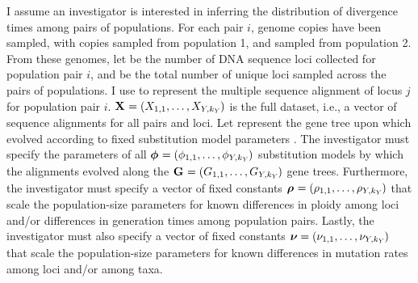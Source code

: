 I assume an investigator is interested in inferring the distribution
of divergence times among \npairs{} pairs of populations.
For each pair $i$,  genome copies have been sampled, with
 copies sampled from population 1, and 
sampled from population 2.
From these genomes, let  be the number of DNA sequence loci collected
for population pair $i$, and \nlociTotal be the total number of unique loci
sampled across the \npairs{} pairs of populations.
I use  to represent the multiple sequence alignment of
locus $j$ for population pair $i$.
$\alignmentVector = (\alignment{1}{1}, \ldots,
    \alignment{\npairs{}}{\nloci{\npairs{}}})$
is the full dataset,
i.e., a vector of sequence alignments for all pairs and loci.
Let  represent the gene tree upon which 
evolved according to fixed \hky substitution model parameters .
The investigator must specify the parameters of all
$\hkyModelVector = (\hkyModel{1}{1}, \ldots,
\hkyModel{\npairs{}}{\nloci{\npairs{}}})$
substitution models by which the alignments evolved along the
$\geneTreeVector = (\geneTree{1}{1}, \ldots,
\geneTree{\npairs{}}{\nloci{\npairs{}}})$
gene trees.
Furthermore, the investigator must specify a vector of fixed constants
$\ploidyScalarVector = (\ploidyScalar{1}{1}, \ldots,
\ploidyScalar{\npairs{}}{\nloci{\npairs{}}})$
that scale the population-size parameters for known differences in ploidy among
loci and/or differences in generation times among population pairs.  Lastly,
the investigator must also specify a vector of fixed constants
$\mutationRateScalarConstantVector = (\mutationRateScalarConstant{1}{1},
\ldots, \mutationRateScalarConstant{\npairs{}}{\nloci{\npairs{}}})$
that scale the population-size parameters for known differences in
mutation rates among loci and/or among taxa.

